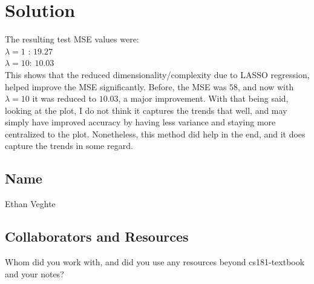 \documentclass[submit]{harvardml}
\newenvironment{solution}
  {\color{blue}\section*{Solution}}
{}
\begin{document}
\begin{solution}
\begin{enumerate}
            The resulting test MSE values were:
            \\ $\lambda = 1$ : $19.27$
            \\ $\lambda = 10$: $10.03$
            \\ This shows that the reduced dimensionality/complexity due to LASSO regression, helped improve the MSE significantly. Before, the MSE was $58$, and now with $\lambda=10$ it was reduced to $10.03$, a major improvement. With that being said, looking at the plot, I do not think it captures the trends that well, and may simply have improved accuracy by having less variance and staying more centralized to the plot. Nonetheless, this method did help in the end, and it does capture the trends in some regard. 

            
	\end{enumerate}
\end{solution}


\newpage
\subsection*{Name} Ethan Veghte

\subsection*{Collaborators and Resources}
Whom did you work with, and did you use any resources beyond cs181-textbook and your notes?
\end{document}
